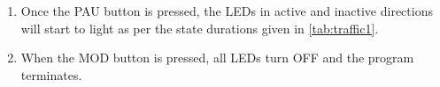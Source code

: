 \begin{enumerate}
\item Once the PAU button is pressed, the LEDs in active and inactive directions
  will start to light as per the state durations given in \autoref{tab:traffic1}.
\item When the MOD button is pressed, all LEDs turn OFF and the program terminates.
\end{enumerate}
 

